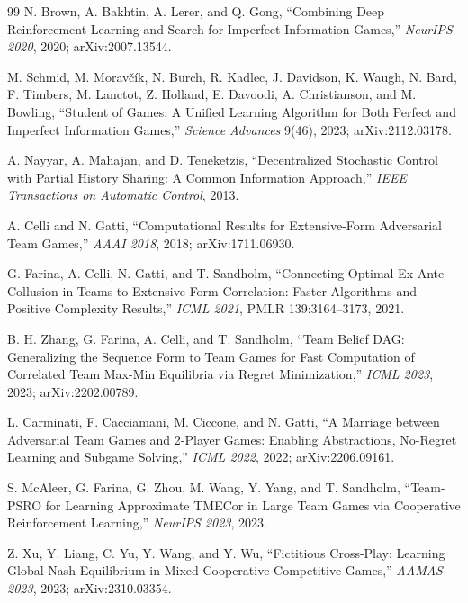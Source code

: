 \begin{thebibliography}{99}
N. Brown, A. Bakhtin, A. Lerer, and Q. Gong, ``Combining Deep Reinforcement
Learning and Search for Imperfect-Information Games,'' \emph{NeurIPS 2020},
2020; arXiv:2007.13544.

M. Schmid, M. Morav\v{c}\'ik, N. Burch, R. Kadlec, J. Davidson, K. Waugh,
N. Bard, F. Timbers, M. Lanctot, Z. Holland, E. Davoodi, A. Christianson, and
M. Bowling, ``Student of Games: A Unified Learning Algorithm for Both Perfect
and Imperfect Information Games,'' \emph{Science Advances} 9(46), 2023;
arXiv:2112.03178.

A. Nayyar, A. Mahajan, and D. Teneketzis, ``Decentralized Stochastic Control
with Partial History Sharing: A Common Information Approach,'' \emph{IEEE
Transactions on Automatic Control}, 2013.

A. Celli and N. Gatti, ``Computational Results for Extensive-Form Adversarial
Team Games,'' \emph{AAAI 2018}, 2018; arXiv:1711.06930.

G. Farina, A. Celli, N. Gatti, and T. Sandholm, ``Connecting Optimal Ex-Ante
Collusion in Teams to Extensive-Form Correlation: Faster Algorithms and Positive
Complexity Results,'' \emph{ICML 2021}, PMLR 139:3164--3173, 2021.

B. H. Zhang, G. Farina, A. Celli, and T. Sandholm, ``Team Belief DAG:
Generalizing the Sequence Form to Team Games for Fast Computation of Correlated
Team Max-Min Equilibria via Regret Minimization,'' \emph{ICML 2023}, 2023;
arXiv:2202.00789.

L. Carminati, F. Cacciamani, M. Ciccone, and N. Gatti, ``A Marriage between
Adversarial Team Games and 2-Player Games: Enabling Abstractions, No-Regret
Learning and Subgame Solving,'' \emph{ICML 2022}, 2022; arXiv:2206.09161.

S. McAleer, G. Farina, G. Zhou, M. Wang, Y. Yang, and T. Sandholm, ``Team-PSRO
for Learning Approximate TMECor in Large Team Games via Cooperative
Reinforcement Learning,'' \emph{NeurIPS 2023}, 2023.

Z. Xu, Y. Liang, C. Yu, Y. Wang, and Y. Wu, ``Fictitious Cross-Play: Learning
Global Nash Equilibrium in Mixed Cooperative-Competitive Games,''
\emph{AAMAS 2023}, 2023; arXiv:2310.03354.



\end{thebibliography}
